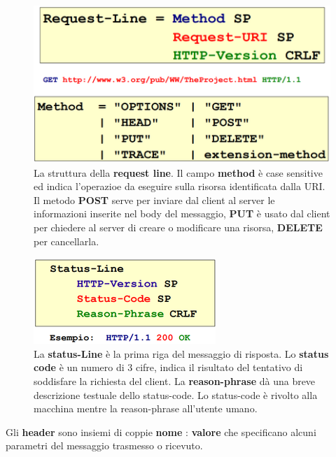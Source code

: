 \documentclass[11pt,a4paper]{article}
\theoremstyle{definition}
\begin{document}
\newpage
\begin{figure}[!h]
	\includegraphics[scale=0.3]{Immagini/Req_line.png}
	\centering
	\caption{La struttura della \textbf{request line}. Il campo \textbf{method} è case sensitive ed indica l'operazioe da eseguire sulla risorsa identificata dalla URI. Il metodo \textbf{POST} serve per inviare dal client al server le
		informazioni inserite nel body del messaggio, \textbf{PUT} è usato dal client per chiedere al server di creare o modificare una risorsa, \textbf{DELETE} per cancellarla.}
\end{figure}
\begin{figure}[!h]
	\includegraphics[scale=0.4]{Immagini/Stat_line.png}
	\centering
	\caption{La \textbf{status-Line} è la prima riga del messaggio di risposta. Lo \textbf{status code} è un numero di 3 cifre, indica il risultato del tentativo di soddisfare la richiesta del client. La \textbf{reason-phrase} dà una breve descrizione testuale dello status-code. Lo status-code è rivolto alla macchina mentre la reason-phrase all'utente umano.}
\end{figure}
Gli \textbf{header} sono insiemi di coppie \textbf{nome} : \textbf{valore} che specificano
alcuni parametri del messaggio trasmesso o ricevuto.
\end{document}
